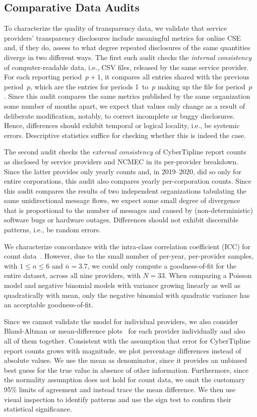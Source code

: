 \documentclass[anonymous,nonacm,screen,12pt]{acmart}
\newcommand\V[1]{{#1}}
\newcommand\V[1]{\textsc{\MakeLowercase{#1}}}
\theoremstyle{definition}
\begin{document}
\subsection{Comparative Data Audits}

To characterize the quality of transparency data, we validate that service
providers' transparency disclosures include meaningful metrics for online
\V{CSE} and, if they do, assess to what degree repeated disclosures of the same
quantities diverge in two different ways. The first such audit checks the
\emph{internal consistency} of computer-readable data, i.e., \V{CSV} files,
released by the same service provider. For each reporting period~$p+1$, it
compares all entries shared with the previous period~$p$, which are the entries
for periods 1~to~$p$ making up the file for period~$p$. Since this audit
compares the same metrics published by the same organization some number of
months apart, we expect that values only change as a result of deliberate
modification, notably, to correct incomplete or buggy disclosures. Hence,
differences should exhibit temporal or logical locality, i.e., be systemic
errors. Descriptive statistics suffice for checking whether this is indeed the
case.

The second audit checks the \emph{external consistency} of CyberTipline report
counts as disclosed by service providers and \V{NCMEC} in its per-provider
breakdown. Since the latter provides only yearly counts and, in 2019--2020, did
so only for entire corporations, this audit also compares yearly per-corporation
counts. Since this audit compares the results of two independent organizations
tabulating the same unidirectional message flows, we expect some small degree of
divergence that is proportional to the number of messages and caused by
(non-deterministic) software bugs or hardware outages. Differences should not
exhibit discernible patterns, i.e., be random errors.

We characterize concordance with the intra-class correlation coefficient
(\V{ICC}) for count data~\cite{Carrasco2022}. However, due to the small number
of per-year, per-provider samples, with $1\leq{}n\leq{}6$ and
$\overline{n}=3.7$, we could only compute a goodness-of-fit for the entire
dataset, across all nine providers, with $N=33$. When comparing a Poisson model
and negative binomial models with variance growing linearly as well as
quadratically with mean, only the negative binomial with quadratic variance has
an acceptable goodness-of-fit.

Since we cannot validate the model for individual providers, we also consider
Bland-Altman or mean-difference plots~\cite{BlandAltman1995} for each provider
individually and also all of them together. Consistent with the assumption that
error for CyberTipline report counts grows with magnitude, we plot percentage
differences instead of absolute values. We use the mean as denominator, since it
provides an unbiased best guess for the true value in absence of other
information. Furthermore, since the normality assumption does not hold for count
data, we omit the customary 95\% limits of agreement and instead trace the mean
difference. We then use visual inspection to identify patterns and use the sign
test to confirm their statistical significance.
\end{document}
